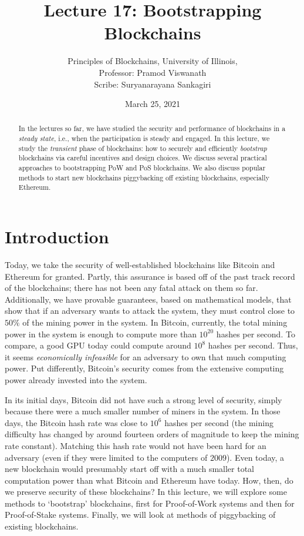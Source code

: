 \documentclass{article}
\title{Lecture 17: Bootstrapping Blockchains}
\author{Principles of Blockchains, University of Illinois,  \\ Professor:  Pramod Viswanath \\ Scribe:  Suryanarayana Sankagiri}
\date{March 25, 2021}
\begin{document}
\maketitle

\begin{abstract}
In the lectures so far, we have studied the security and performance of blockchains in a {\em steady state}, i.e., when the participation is steady and engaged. In this lecture, we study the {\em transient} phase of blockchains: how to securely and efficiently {\em bootstrap} blockchains via careful incentives and design choices. We discuss several practical approaches to bootstrapping PoW and PoS blockchains. We also discuss popular methods to start new blockchains piggybacking off existing blockchains, especially {\sf Ethereum}.
\end{abstract}

\section*{Introduction}
Today, we take the security of well-established blockchains like Bitcoin and Ethereum for granted. Partly, this assurance is based off of the past track record of the blockchains; there has not been any fatal attack on them so far. Additionally, we have provable guarantees, based on mathematical models, that show that if an adversary wants to attack the system, they must control close to $50\%$ of the mining power in the system. In Bitcoin, currently, the total mining power in the system is enough to compute more than $10^{20}$ hashes per second. To compare, a good GPU today could compute around $10^{8}$ hashes per second. Thus, it seems \textit{economically infeasible} for an adversary to own that much computing power. Put differently, Bitcoin's security comes from the extensive computing power already invested into the system.

In its initial days, Bitcoin did not have such a strong level of security, simply because there were a much smaller number of miners in the system. In those days, the Bitcoin hash rate was close to $10^6$ hashes per second (the mining difficulty has changed by around fourteen orders of magnitude to keep the mining rate constant). Matching this hash rate would not have been hard for an adversary (even if they were limited to the computers of $2009$). Even today, a new blockchain would presumably start off with a much smaller total computation power than what Bitcoin and Ethereum have today. How, then, do we preserve security of these blockchains? In this lecture, we will explore some methods to `bootstrap' blockchains, first for Proof-of-Work systems and then for Proof-of-Stake systems. Finally, we will look at methods of piggybacking of existing blockchains.
\end{document}
